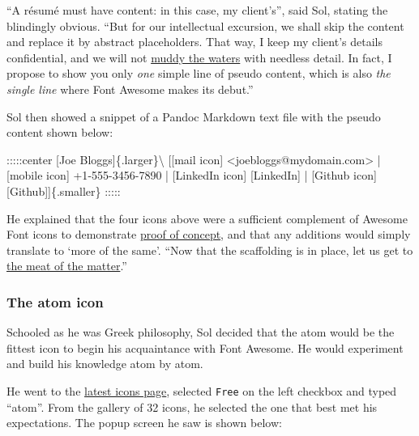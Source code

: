 \documentclass[
  british,
  a4paper,
  rgb,
  dvipsnames,
  svgnames,
  hyphens]{article}
\newenvironment{Shaded}{\begin{snugshade}}{\end{snugshade}}
\newcommand{\CommentTok}[1]{\textcolor[rgb]{0.50,0.62,0.50}{#1}}
\newcommand{\NormalTok}[1]{\textcolor[rgb]{0.80,0.80,0.80}{#1}}
\newcommand{\OtherTok}[1]{\textcolor[rgb]{0.94,0.94,0.56}{#1}}
\begin{document}
``A résumé must have content: in this case, my client's'', said Sol,
stating the blindingly obvious. ``But for our intellectual excursion, we
shall skip the content and replace it by abstract placeholders. That
way, I keep my client's details confidential, and we will not
\href{https://idioms.thefreedictionary.com/muddy+the+waters}{muddy the
waters} with needless detail. In fact, I propose to show you only
\emph{one} simple line of pseudo content, which is also \emph{the single
line} where Font Awesome makes its debut.''

Sol then showed a snippet of a Pandoc Markdown text file with the pseudo
content shown below:

\begin{Shaded}
\begin{Highlighting}[]
\NormalTok{:::::center}
\CommentTok{[}\OtherTok{Joe Bloggs}\CommentTok{]}\NormalTok{\{.larger\}\textbackslash{}}
\NormalTok{[}\CommentTok{[}\OtherTok{mail icon}\CommentTok{]} \OtherTok{\textless{}joebloggs@mydomain.com\textgreater{}}\NormalTok{ |}
\CommentTok{[}\OtherTok{mobile icon}\CommentTok{]}\NormalTok{ +1{-}555{-}3456{-}7890 |}
\CommentTok{[}\OtherTok{LinkedIn icon}\CommentTok{] [LinkedIn]}\NormalTok{ |}
\CommentTok{[}\OtherTok{Github icon}\CommentTok{] [Github]}\NormalTok{]\{.smaller\}}
\NormalTok{:::::}
\end{Highlighting}
\end{Shaded}

He explained that the four icons above were a sufficient complement of
Awesome Font icons to demonstrate
\href{https://en.wikipedia.org/wiki/Proof_of_concept}{proof of concept},
and that any additions would simply translate to `more of the same'.
``Now that the scaffolding is in place, let us get to
\href{https://idioms.thefreedictionary.com/meat+of+the+matter}{the meat
of the matter}.''

\hypertarget{the-atom-icon}{%
\subsubsection{The atom icon}\label{the-atom-icon}}

Schooled as he was Greek philosophy, Sol decided that the atom would be
the fittest icon to begin his acquaintance with Font Awesome. He would
experiment and build his knowledge atom by atom.

He went to the \href{https://fontawesome.com/v6.0/icons}{latest icons
page}, selected \texttt{Free} on the left checkbox and typed ``atom''.
From the gallery of 32 icons, he selected the one that best met his
expectations. The popup screen he saw is shown below:
\end{document}

